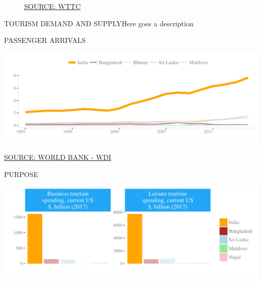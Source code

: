\documentclass{article}\usepackage[]{graphicx}\usepackage[]{color}
\makeatletter
\def\maxwidth{ %
  \ifdim\Gin@nat@width>\linewidth
    \linewidth
  \else
    \Gin@nat@width
  \fi
}
\makeatother
\begin{document}
\begin{figure}
\begin{minipage}[t]{0.99\textwidth}
\begin{minipage}[t]{0.56\textwidth}
\begin{minipage}[c]{0.30\textwidth}
{}



    \vspace{-2ex}
    \hspace{2ex}\tiny{\href{https://tool.wttc.org/}{\textcolor[HTML]{722FF5}{SOURCE: WTTC}}}
    \end{minipage}
  \end{minipage}
\end{minipage}
\end{figure}

\begin{minipage}[t]{0.95\textwidth}
  \begin{flushleft}  
    \hspace{4ex}\Large{\textcolor[HTML]{722FF5}{TOURISM DEMAND AND SUPPLY}}\hspace{2ex}\small{\textcolor[HTML]{818181}{Here goes a description}}
  \end{flushleft}
  \begin{minipage}[b]{0.5\textwidth}
      \hspace{4ex}\small{\textcolor[HTML]{818181}{PASSENGER ARRIVALS}}
      \vspace{1ex}


\hfill{}\includegraphics[width=\maxwidth]{figure/line1-1} 



     \hspace{4ex}\scriptsize{\href{NA}{\textcolor[HTML]{722FF5}{SOURCE: WORLD BANK - WDI}}}
  \end{minipage}
  \begin{minipage}[b]{0.5\textwidth}  
      \hspace{4ex}\small{\textcolor[HTML]{818181}{PURPOSE}}
      \vspace{1ex}


\hfill{}\includegraphics[width=\maxwidth]{figure/bar_wrap1-1} 




\end{minipage}
\end{minipage}
\end{document}
